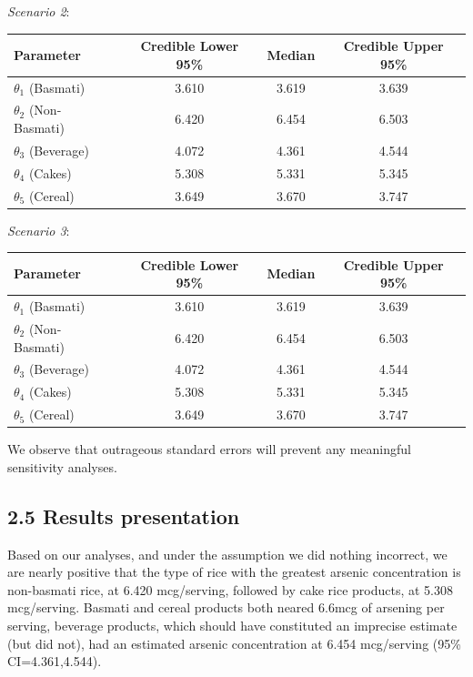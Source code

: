 \documentclass[]{article}
\begin{document}
\textit{Scenario 2}:

\begin{center}
  \begin{tabular}{l c c c}
  \hline Parameter & Credible Lower 95\% & Median & Credible Upper 95\%  \\ \hline
    $\theta_1$ (Basmati) & 3.610 & 3.619 & 3.639 \\ 
    $\theta_2$ (Non-Basmati) & 6.420 & 6.454 & 6.503 \\
    $\theta_3$ (Beverage) & 4.072 & 4.361 & 4.544 \\
    $\theta_4$ (Cakes) & 5.308 & 5.331 & 5.345 \\
    $\theta_5$ (Cereal) & 3.649 & 3.670 & 3.747 \\ \hline
  \end{tabular}
\end{center}

\textit{Scenario 3}:

\begin{center}
  \begin{tabular}{l c c c}
  \hline Parameter & Credible Lower 95\% & Median & Credible Upper 95\%  \\ \hline
    $\theta_1$ (Basmati) & 3.610 & 3.619 & 3.639 \\ 
    $\theta_2$ (Non-Basmati) & 6.420 & 6.454 & 6.503 \\
    $\theta_3$ (Beverage) & 4.072 & 4.361 & 4.544 \\
    $\theta_4$ (Cakes) & 5.308 & 5.331 & 5.345 \\
    $\theta_5$ (Cereal) & 3.649 & 3.670 & 3.747 \\ \hline
  \end{tabular}
\end{center}

We observe that outrageous standard errors will prevent any meaningful
sensitivity analyses.

\subsection{2.5 Results presentation}

Based on our analyses, and under the assumption we did nothing
incorrect, we are nearly positive that the type of rice with the
greatest arsenic concentration is non-basmati rice, at 6.420
mcg/serving, followed by cake rice products, at 5.308 mcg/serving.
Basmati and cereal products both neared 6.6mcg of arsening per serving,
beverage products, which should have constituted an imprecise estimate
(but did not), had an estimated arsenic concentration at 6.454
mcg/serving (95\% CI=4.361,4.544).
\end{document}
